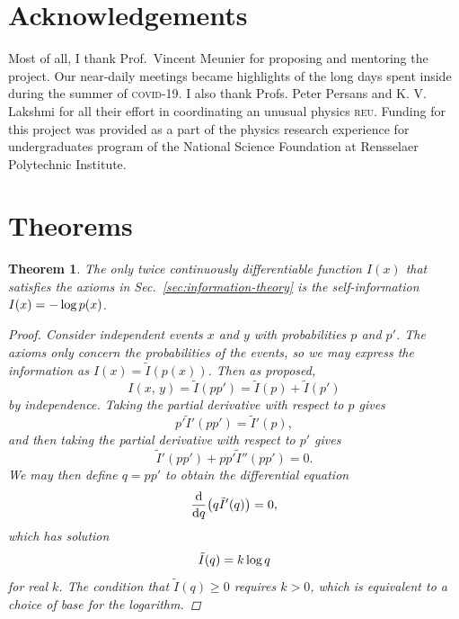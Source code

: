 \documentclass[aps,reprint,floatfix]{revtex4-2}
\renewcommand\mathrm\textnormal%
\theoremstyle{plain}
\newtheorem{thm}{Theorem}[section]
\theoremstyle{definition}
\renewcommand\log{\operatorname{\mathrm{log}}}
\begin{document}
\section{Acknowledgements}

Most of all, I thank Prof.\ Vincent Meunier for proposing and mentoring the
project. Our near-daily meetings became highlights of the long days spent inside
during the summer of \textsc{covid-19}. I also thank Profs. Peter Persans and K.
V. Lakshmi for all their effort in coordinating an unusual physics \textsc{reu}.
Funding for this project was provided as a part of the physics research
experience for undergraduates program of the National Science Foundation at
Rensselaer Polytechnic Institute.

\appendix

\section{Theorems}

\begin{thm}\label{thm:self-information}
  The only twice continuously differentiable function $I(x)$ that satisfies the
  axioms in Sec.~\ref{sec:information-theory} is the self-information $I(x) =
  -\log p(x)$.
  \begin{proof}
    Consider independent events $x$ and $y$ with probabilities $p$ and $p'$. The
    axioms only concern the probabilities of the events, so we may express the
    information as $I(x) = \tilde{I}(p(x))$. Then as proposed,
    \[
      I(x,\, y)
      = \tilde{I}(pp')
      = \tilde{I}(p) + \tilde{I}(p')
    \]
    by independence. Taking the partial derivative with respect to $p$ gives
    \[
      p' \tilde{I}'(pp')
      = \tilde{I}'(p),
    \]
    and then taking the partial derivative with respect to $p'$ gives
    \[
      \tilde{I}'(pp') + pp' \tilde{I}''(pp')
      = 0.
    \]
    We may then define $q = pp'$ to obtain the differential equation
    \[
      \dv{q}\qty(q \tilde{I}'(q))
      = 0,
    \]
    which has solution
    \[
      \tilde{I}(q) = k\log q
    \]
    for real $k$. The condition that $\tilde{I}(q) \ge 0$ requires $k > 0$,
    which is equivalent to a choice of base for the logarithm.
  \end{proof}
\end{thm}
\end{document}
